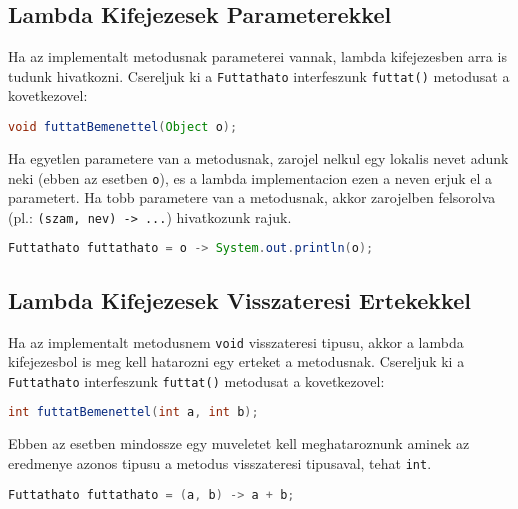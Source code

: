 \documentclass{article}
\let\l\lstinline
\begin{document}
\newpage

\subsection{Lambda Kifejezesek Parameterekkel}

Ha az implementalt metodusnak parameterei vannak, lambda kifejezesben arra is tudunk hivatkozni. Csereljuk ki a \l{Futtathato} interfeszunk \l{futtat()} metodusat a kovetkezovel:

\begin{lstlisting}[language=Java, caption=Absztrakt metodus parameterrel]
void futtatBemenettel(Object o);
\end{lstlisting}

Ha egyetlen parametere van a metodusnak, zarojel nelkul egy lokalis nevet adunk neki (ebben az esetben \l{o}), es a lambda implementacion ezen a neven erjuk el a parametert. Ha tobb parametere van a metodusnak, akkor zarojelben felsorolva (pl.: \l{(szam, nev) -> ...}) hivatkozunk rajuk.

\begin{lstlisting}[language=Java, caption=Parameteres absztrakt metodus implementalasa lambda kifejezessel]
Futtathato futtathato = o -> System.out.println(o);
\end{lstlisting}

\subsection{Lambda Kifejezesek Visszateresi Ertekekkel}

Ha az implementalt metodusnem \l{void} visszateresi tipusu, akkor a lambda kifejezesbol is meg kell hatarozni egy erteket a metodusnak. Csereljuk ki a \l{Futtathato} interfeszunk \l{futtat()} metodusat a kovetkezovel:

\begin{lstlisting}[language=Java, caption=Absztrakt metodus visszateresi ertekkel]
int futtatBemenettel(int a, int b);
\end{lstlisting}

Ebben az esetben mindossze egy muveletet kell meghataroznunk aminek az eredmenye azonos tipusu a metodus visszateresi tipusaval, tehat \l{int}.

\begin{lstlisting}[language=Java, caption=Nem void absztrakt metodus implementalasa lambda kifejezessel]
Futtathato futtathato = (a, b) -> a + b;
\end{lstlisting}
\end{document}
